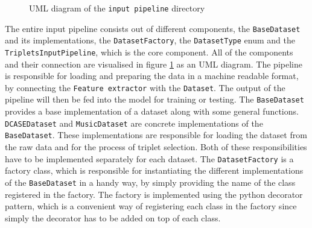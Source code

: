 \begin{figure}[htbp]
{
    }
	\caption{UML diagram of the \texttt{input pipeline} directory}
	\label{fig:UML-Input-Pipeline}
\end{figure}
\noindent
The entire input pipeline consists out of different components, the \texttt{BaseDataset} and its implementations, the \texttt{DatasetFactory}, the \texttt{DatasetType} enum and the \texttt{TripletsInputPipeline}, which is the core component. All of the components and their connection are visualised in figure \ref{fig:UML-Input-Pipeline} as an UML diagram. The pipeline is responsible for loading and preparing the data in a machine readable format, by connecting the \texttt{Feature extractor} with the \texttt{Dataset}. The output of the pipeline will then be fed into the model for training or testing.
\newline
\newline
The \texttt{BaseDataset} provides a base implementation of a dataset along with some general functions. \texttt{DCASEDataset} and \texttt{MusicDataset} are concrete implementations of the \texttt{BaseDataset}. These implementations are responsible for loading the dataset from the raw data and for the process of triplet selection. Both of these responsibilities have to be implemented separately for each dataset. The \texttt{DatasetFactory} is a factory class, which is responsible for instantiating the different implementations of the \texttt{BaseDataset} in a handy way, by simply providing the name of the class registered in the factory. The factory is implemented using the python decorator pattern, which is a convenient way of registering each class in the factory since simply the decorator has to be added on top of each class.

